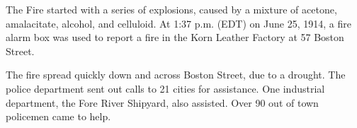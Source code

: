 \documentclass{article}
\begin{document}
\begin{multicols}{3}
{\begin{window}
\end{window}
\closearticle


\begin{window} The Fire started with a series of explosions, caused by a mixture of acetone, amalacitate, alcohol, and celluloid. At 1:37 p.m. (EDT) on June 25, 1914, a fire alarm box was used to report a fire in the Korn Leather Factory at 57 Boston Street.

The fire spread quickly down and across Boston Street, due to a drought. The police department sent out calls to 21 cities for assistance. One industrial department, the Fore River Shipyard, also assisted. Over 90 out of town policemen came to help.


\end{window}

}
\end{multicols}
\end{document}
